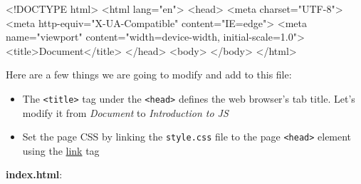 \documentclass[
  letterpaper,
  DIV=11,
  numbers=noendperiod]{scrreprt}
\newenvironment{Shaded}{\begin{snugshade}}{\end{snugshade}}
\newcommand{\DataTypeTok}[1]{\textcolor[rgb]{0.68,0.00,0.00}{#1}}
\newcommand{\ErrorTok}[1]{\textcolor[rgb]{0.68,0.00,0.00}{#1}}
\newcommand{\KeywordTok}[1]{\textcolor[rgb]{0.00,0.23,0.31}{#1}}
\newcommand{\NormalTok}[1]{\textcolor[rgb]{0.00,0.23,0.31}{#1}}
\newcommand{\OtherTok}[1]{\textcolor[rgb]{0.00,0.23,0.31}{#1}}
\newcommand{\StringTok}[1]{\textcolor[rgb]{0.13,0.47,0.30}{#1}}
\providecommand{\tightlist}{%
  \setlength{\itemsep}{0pt}\setlength{\parskip}{0pt}}\usepackage{longtable,booktabs,array}
\begin{document}
\begin{Shaded}
\begin{Highlighting}[]
\DataTypeTok{\textless{}!DOCTYPE }\NormalTok{html}\DataTypeTok{\textgreater{}}
\KeywordTok{\textless{}html} \ErrorTok{lang}\OtherTok{=}\StringTok{"en"}\KeywordTok{\textgreater{}}
\KeywordTok{\textless{}head\textgreater{}}
    \KeywordTok{\textless{}meta} \ErrorTok{charset}\OtherTok{=}\StringTok{"UTF{-}8"}\KeywordTok{\textgreater{}}
    \KeywordTok{\textless{}meta} \ErrorTok{http{-}equiv}\OtherTok{=}\StringTok{"X{-}UA{-}Compatible"} \ErrorTok{content}\OtherTok{=}\StringTok{"IE=edge"}\KeywordTok{\textgreater{}}
    \KeywordTok{\textless{}meta} \ErrorTok{name}\OtherTok{=}\StringTok{"viewport"} \ErrorTok{content}\OtherTok{=}\StringTok{"width=device{-}width, initial{-}scale=1.0"}\KeywordTok{\textgreater{}}
    \KeywordTok{\textless{}title\textgreater{}}\NormalTok{Document}\KeywordTok{\textless{}/title\textgreater{}}
\KeywordTok{\textless{}/head\textgreater{}}
\KeywordTok{\textless{}body\textgreater{}}
\KeywordTok{\textless{}/body\textgreater{}}
\KeywordTok{\textless{}/html\textgreater{}}
\end{Highlighting}
\end{Shaded}

Here are a few things we are going to modify and add to this file:

\begin{itemize}
\tightlist
\item
  The \texttt{\textless{}title\textgreater{}} tag under the
  \texttt{\textless{}head\textgreater{}} defines the web browser's tab
  title. Let's modify it from \emph{Document} to \emph{Introduction to
  JS}
\item
  Set the page CSS by linking the \texttt{style.css} file to the page
  \texttt{\textless{}head\textgreater{}} element using the
  \href{https://www.w3schools.com/tags/tag_link.asp}{link} tag
\end{itemize}

\textbf{index.html}:
\end{document}
